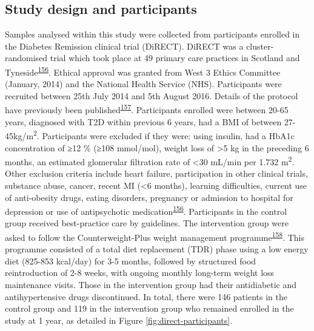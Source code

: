 \documentclass[11pt,twoside]{bristolthesis}
\begin{document}
\hypertarget{study-design-and-participants}{%
\subsection{Study design and participants}\label{study-design-and-participants}}

Samples analysed within this study were collected from participants enrolled in the Diabetes Remission clinical trial (DiRECT). DiRECT was a cluster-randomised trial which took place at 49 primary care practices in Scotland and Tyneside\textsuperscript{\protect\hyperlink{ref-Lean2018}{156}}. Ethical approval was granted from West 3 Ethics Committee (January, 2014) and the National Health Service (NHS). Participants were recruited between 25th July 2014 and 5th August 2016. Details of the protocol have previously been published\textsuperscript{\protect\hyperlink{ref-Leslie2016}{157}}. Participants enrolled were between 20-65 years, diagnosed with T2D within previous 6 years, had a BMI of between 27-45kg/m\textsuperscript{2}. Participants were excluded if they were: using insulin, had a HbA1c concentration of ≥12 \% (≥108 mmol/mol), weight loss of \textgreater5 kg in the preceding 6 months, an estimated glomerular filtration rate of \textless30 mL/min per 1.732 m\textsuperscript{2}. Other exclusion criteria include heart failure, participation in other clinical trials, substance abuse, cancer, recent MI (\textless6 months), learning difficulties, current use of anti-obesity drugs, eating disorders, pregnancy or admission to hospital for depression or use of antipsychotic medication\textsuperscript{\protect\hyperlink{ref-Lean2018}{156}}. Participants in the control group received best-practice care by guidelines. The intervention group were asked to follow the Counterweight-Plus weight management programme\textsuperscript{\protect\hyperlink{ref-Lean2013}{158}}. This programme consisted of a total diet replacement (TDR) phase using a low energy diet (825-853 kcal/day) for 3-5 months, followed by structured food reintroduction of 2-8 weeks, with ongoing monthly long-term weight loss maintenance visits. Those in the intervention group had their antidiabetic and antihypertensive drugs discontinued. In total, there were 146 patients in the control group and 119 in the intervention group who remained enrolled in the study at 1 year, as detailed in Figure \ref{fig:direct-participants}.
\end{document}
